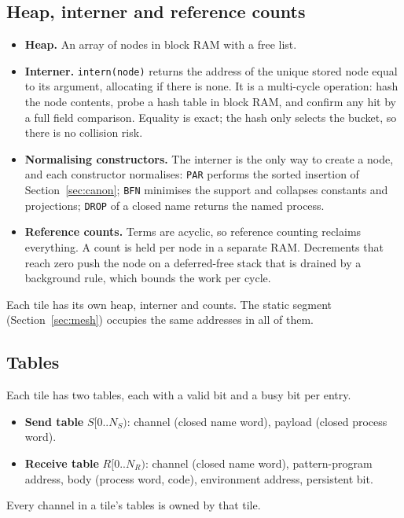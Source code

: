 \documentclass[11pt]{article}
\newcommand{\kw}[1]{\texttt{#1}}
\theoremstyle{definition}
\theoremstyle{remark}
\begin{document}
\subsection{Heap, interner and reference counts}\label{sec:heap}

\begin{itemize}
\item \textbf{Heap.} An array of nodes in block RAM with a free list.
\item \textbf{Interner.} \kw{intern(node)} returns the address of the unique
stored node equal to its argument, allocating if there is none. It is a
multi-cycle operation: hash the node contents, probe a hash table in block
RAM, and confirm any hit by a full field comparison. Equality is exact; the
hash only selects the bucket, so there is no collision risk.
\item \textbf{Normalising constructors.} The interner is the only way to
create a node, and each constructor normalises: \kw{PAR} performs the sorted
insertion of Section~\ref{sec:canon}; \kw{BFN} minimises the support and
collapses constants and projections; \kw{DROP} of a closed name returns the
named process.
\item \textbf{Reference counts.} Terms are acyclic, so reference counting
reclaims everything. A count is held per node in a separate RAM.
Decrements that reach zero push the node on a deferred-free stack that is
drained by a background rule, which bounds the work per cycle.
\end{itemize}

Each tile has its own heap, interner and counts. The static segment
(Section~\ref{sec:mesh}) occupies the same addresses in all of them.

\subsection{Tables}

Each tile has two tables, each with a valid bit and a busy bit per entry.
\begin{itemize}
\item \textbf{Send table} $S[0..N_S)$: channel (closed name word), payload
(closed process word).
\item \textbf{Receive table} $R[0..N_R)$: channel (closed name word),
pattern-program address, body (process word, code), environment address,
persistent bit.
\end{itemize}
Every channel in a tile's tables is owned by that tile.
\end{document}
